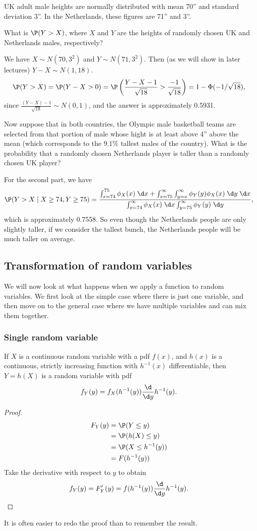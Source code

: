 \documentclass[a4paper]{article}
\begin{document}
\begin{eg}
  UK adult male heights are normally distributed with mean 70'' and standard deviation 3''. In the Netherlands, these figures are 71'' and 3''.

  What is $\P(Y > X)$, where $X$ and $Y$ are the heights of randomly chosen UK and Netherlands males, respectively?

  We have $X\sim N(70, 3^2)$ and $Y\sim N(71, 3^2)$. Then (as we will show in later lectures) $Y - X \sim N(1, 18)$.
  \[
    \P(Y > X) = \P(Y - X > 0) = \P\left(\frac{Y - X - 1}{\sqrt{18}} > \frac{-1}{\sqrt{18}}\right) = 1 - \Phi(-1/\sqrt{18}),
  \]
  since $\frac{(Y - X) - 1}{\sqrt{18}}\sim N(0, 1)$, and the answer is approximately 0.5931.

  Now suppose that in both countries, the Olympic male basketball teams are selected from that portion of male whose hight is at least above 4'' above the mean (which corresponds to the $9.1\%$ tallest males of the country). What is the probability that a randomly chosen Netherlands player is taller than a randomly chosen UK player?

  For the second part, we have
  \[
    \P(Y > X\mid X \geq 74, Y \geq 75) = \frac{\int_{x = 74}^{75} \phi_X(x)\;\d x + \int_{x = 75}^\infty \int_{y=x}^\infty \phi_Y(y)\phi_X(x)\;\d y\;\d x}{\int_{x=74}^\infty \phi_X(x)\;\d x \int_{y=75}^\infty \phi_Y(y)\;\d y},
  \]
  which is approximately 0.7558. So even though the Netherlands people are only slightly taller, if we consider the tallest bunch, the Netherlands people will be much taller on average.
\end{eg}

\subsection{Transformation of random variables}
We will now look at what happens when we apply a function to random variables. We first look at the simple case where there is just one variable, and then move on to the general case where we have multiple variables and can mix them together.
\subsubsection*{Single random variable}
\begin{thm}
  If $X$ is a continuous random variable with a pdf $f(x)$, and $h(x)$ is a continuous, strictly increasing function with $h^{-1}(x)$ differentiable, then $Y = h(X)$ is a random variable with pdf
  \[
    f_Y(y) = f_X(h^{-1}(y))\frac{\d }{\d y}h^{-1}(y).
  \]
\end{thm}
\begin{proof}
  \begin{align*}
    F_Y(y) &= \P(Y \leq y)\\
    &= \P(h(X) \leq y)\\
    &= \P(X \leq h^{-1}(y))\\
    &= F(h^{-1}(y))
  \end{align*}
  Take the derivative with respect to $y$ to obtain
  \[
    f_Y(y) = F'_Y(y) = f(h^{-1}(y))\frac{\d}{\d y}h^{-1}(y).\qedhere
  \]
\end{proof}
It is often easier to redo the proof than to remember the result.
\end{document}
